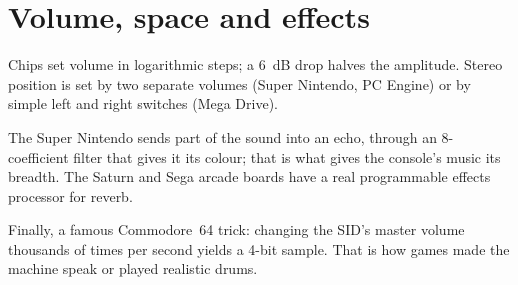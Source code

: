 \section{Volume, space and effects}
Chips set volume in logarithmic steps; a 6~dB drop halves the amplitude. Stereo position is set by two separate
volumes (Super Nintendo, PC Engine) or by simple left and right switches (Mega Drive).

The Super Nintendo sends part of the sound into an echo, through an 8-coefficient filter that gives it its colour;
that is what gives the console's music its breadth. The Saturn and Sega arcade boards have a real programmable
effects processor for reverb.

Finally, a famous Commodore~64 trick: changing the SID's master volume thousands of times per second yields a 4-bit
sample. That is how games made the machine speak or played realistic drums.
